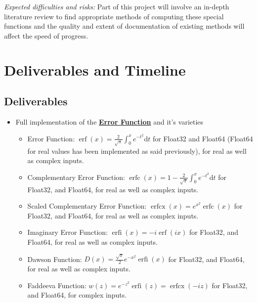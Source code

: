 \documentclass{article}
\theoremstyle{mytheoremstyle}
\theoremstyle{mytheoremstyle}
\theoremstyle{myproblemstyle}
\begin{document}
    \medskip
    \textit{Expected difficulties and risks:} 
    Part of this project will involve an in-depth literature review to find appropriate methods of computing these special functions and the quality and extent of documentation of existing methods will affect the speed of progress.
  \newpage
  \section*{Deliverables and Timeline}\label{sec:Methods} %
    \subsection*{Deliverables}
      \begin{itemize}
        \item Full implementation of the \href{https://github.com/JuliaMath/SpecialFunctions.jl/blob/master/src/erf.jl}{\textbf{Error Function}} and it's varieties \cite{error function}
          \begin{itemize}
            \item Error Function: $\operatorname{erf } (x)=\frac{2 }{\sqrt{\pi } }\int_{0}^{x} e ^{-t^2}\text{d}t$ for Float32 and Float64 (Float64 for real values has been implemented as said previously), for real as well as complex inputs.
            \item Complementary Error Function: $\operatorname{erfc } (x)=1- \frac{2 }{\sqrt{\pi } }\int_{0}^{x} e ^{-t^2}\text{d}t$ for Float32, and Float64, for real as well as complex inputs.
            \item Scaled Complementary Error Function: $\operatorname{erfcx } (x)=e ^{x^2 } \operatorname{erfc} (x)$ for Float32, and Float64, for real as well as complex inputs.
            \item Imaginary Error Function: $\operatorname{erfi } (x)= -i \operatorname{erf} (ix)$ for Float32, and Float64, for real as well as complex inputs.
            \item Dawson Function: $D (x)=\frac{\sqrt{\pi } }{2 }e ^{-x^2 } \operatorname{erfi} (x)$ for Float32, and Float64, for real as well as complex inputs.
            \item Faddeeva Function: $w (z)=e ^{-z^2 } \operatorname{erfi} (z)= \operatorname{erfcx}(-iz)$ for Float32, and Float64, for complex inputs.
          \end{itemize}

\end{itemize}
\end{document}
